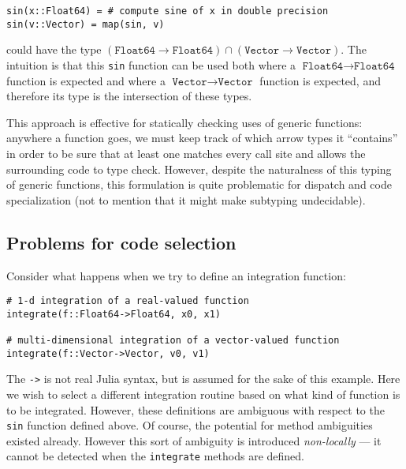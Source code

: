 \begin{singlespace}
\begin{lstlisting}[style=customjulia]
sin(x::Float64) = # compute sine of x in double precision
sin(v::Vector) = map(sin, v)
\end{lstlisting}
\end{singlespace}

\noindent
could have the type $(\texttt{Float64}\rightarrow\texttt{Float64})\cap(\texttt{Vector}\rightarrow\texttt{Vector})$. The intuition is that this \texttt{sin} function can be
used both where a $\texttt{Float64}\rightarrow\texttt{Float64}$ function
is expected and where a $\texttt{Vector}\rightarrow\texttt{Vector}$ function is expected,
and therefore its type is the intersection of these types.

This approach is effective for statically checking uses of generic
functions: anywhere a function goes, we must keep track of which arrow
types it ``contains'' in order to be sure that at least one matches
every call site and allows the surrounding code to type check.
However, despite the naturalness of this typing of generic functions,
this formulation is quite problematic for dispatch and code specialization
(not to mention that it might make subtyping undecidable).

\subsection{Problems for code selection}

Consider what happens when we try to define an integration function:

\begin{singlespace}
\begin{lstlisting}[style=customjulia]
# 1-d integration of a real-valued function
integrate(f::Float64->Float64, x0, x1)

# multi-dimensional integration of a vector-valued function
integrate(f::Vector->Vector, v0, v1)
\end{lstlisting}
\end{singlespace}

\noindent
The \texttt{->} is not real Julia syntax, but is assumed for the sake of
this example.
Here we wish to select a different integration routine based on what
kind of function is to be integrated.
However, these definitions are ambiguous with respect to the \texttt{sin}
function defined above.
Of course, the potential for method ambiguities existed already.
However this sort of ambiguity is introduced \emph{non-locally} ---
it cannot be detected when the \texttt{integrate} methods are defined.

